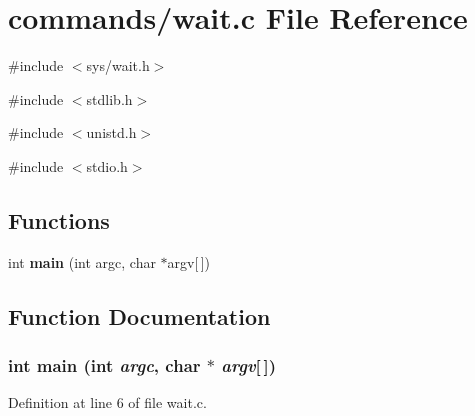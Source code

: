 \section{commands/wait.c File Reference}
\label{wait_8c}
{\ttfamily \#include $<$sys/wait.h$>$}\par
{\ttfamily \#include $<$stdlib.h$>$}\par
{\ttfamily \#include $<$unistd.h$>$}\par
{\ttfamily \#include $<$stdio.h$>$}\par
\subsection*{Functions}
\begin{DoxyCompactItemize}
\item 
int {\bf main} (int argc, char $\ast$argv[$\,$])
\end{DoxyCompactItemize}


\subsection{Function Documentation}
\subsubsection[{main}]{\setlength{\rightskip}{0pt plus 5cm}int main (int {\em argc}, \/  char $\ast$ {\em argv}[$\,$])}\label{wait_8c_a0ddf1224851353fc92bfbff6f499fa97}


Definition at line 6 of file wait.c.

